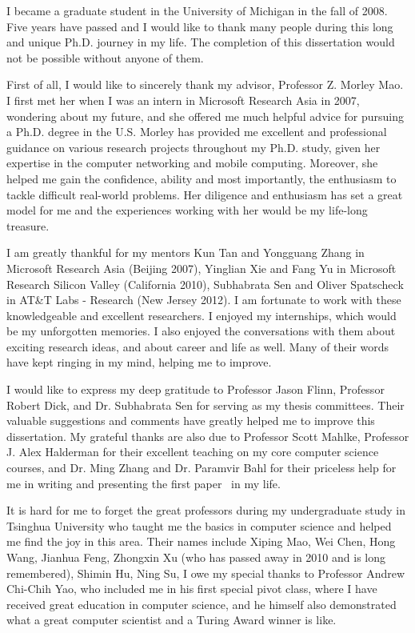 \startacknowledgementspage

I became a graduate student in the University of Michigan in the fall of 2008. Five years have passed and I would like to thank many people during this long and unique Ph.D. journey in my life. The completion of this dissertation would not be possible without anyone of them.

First of all, I would like to sincerely thank my advisor, Professor Z. Morley Mao. I first met her when I was an intern in Microsoft Research Asia in 2007, wondering about my future, and she offered me much helpful advice for pursuing a Ph.D. degree in the U.S. Morley has provided me excellent and professional guidance on various research projects throughout my Ph.D. study, given her expertise in the computer networking and mobile computing. Moreover, she helped me gain the confidence, ability and most importantly, the enthusiasm to tackle difficult real-world problems. Her diligence and enthusiasm has set a great model for me and the experiences working with her would be my life-long treasure.

I am greatly thankful for my mentors Kun Tan and Yongguang Zhang in Microsoft Research Asia (Beijing 2007), Yinglian Xie and Fang Yu in Microsoft Research Silicon Valley (California 2010), Subhabrata Sen and Oliver Spatscheck in AT\&T Labs - Research (New Jersey 2012). I am fortunate to work with these knowledgeable and excellent researchers. I enjoyed my internships, which would be my unforgotten memories. I also enjoyed the conversations with them about exciting research ideas, and about career and life as well. Many of their words have kept ringing in my mind, helping me to improve.

I would like to express my deep gratitude to Professor Jason Flinn, Professor Robert Dick, and Dr. Subhabrata Sen for serving as my thesis committees. Their valuable suggestions and comments have greatly helped me to improve this dissertation. My grateful thanks are also due to Professor Scott Mahlke, Professor J. Alex Halderman for their excellent teaching on my core computer science courses, and Dr. Ming Zhang and Dr. Paramvir Bahl for their priceless help for me in writing and presenting the first paper~\cite{mobisys.3gtest} in my life.

It is hard for me to forget the great professors during my undergraduate study in Tsinghua University who taught me the basics in computer science and helped me find the joy in this area. Their names include Xiping Mao, Wei Chen, Hong Wang, Jianhua Feng, Zhongxin Xu (who has passed away in 2010 and is long remembered), Shimin Hu, Ning Su, \etc I owe my special thanks to Professor Andrew Chi-Chih Yao, who included me in his first special pivot class, where I have received great education in computer science, and he himself also demonstrated what a great computer scientist and a Turing Award winner is like.

